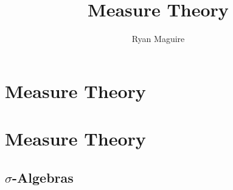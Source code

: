 \documentclass[crop=false,class=book,oneside]{standalone}                      %
\begin{document}
    \ifx\ifmain\undefined
        \title{Measure Theory}
        \author{Ryan Maguire}
        \date{\vspace{-5ex}}
        \maketitle
        \tableofcontents
        \clearpage
        \chapter*{Measure Theory}
        \vspace{10ex}
        \setcounter{chapter}{1}
    \else
        \chapter{Measure Theory}
    \fi
    \section{\texorpdfstring{$\sigma$}{Sigma}-Algebras}
\end{document}
